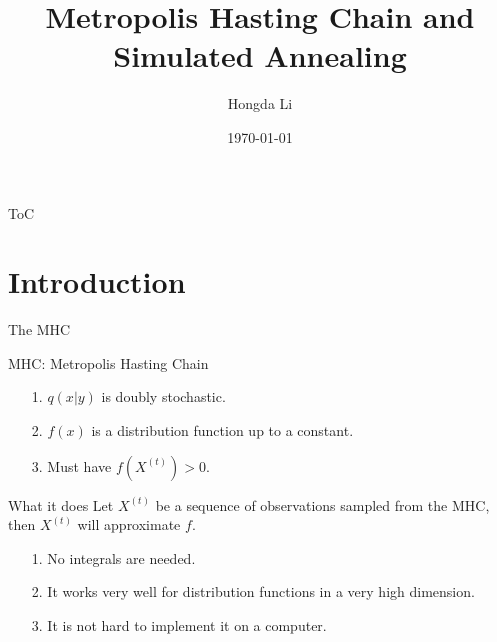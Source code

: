 \documentclass[11pt]{beamer}
\author{Hongda Li}
\title[MHC and SA]{Metropolis Hasting Chain and Simulated Annealing}
\institute[]{UBC Okanagan}
\date{\today}
\begin{document}
\begin{frame}
    \titlepage
\end{frame}

\begin{frame}{ToC}
    \tableofcontents
\end{frame}

\section{Introduction}

    \begin{frame}{The MHC}
        \begin{block}{MHC: Metropolis Hasting Chain}
            \begin{algorithmic}[H]
            \end{algorithmic}
        \end{block}
        \begin{itemize}
            \item [1.] $q(x|y)$ is doubly stochastic. 
            \item [2.] $f(x)$ is a distribution function up to a constant. 
            \item [3.] Must have $f(X^{(t)}) > 0$. 
        \end{itemize}
    \end{frame}
    \begin{frame}{What it does}
        Let $X^{(t)}$ be a sequence of observations sampled from the MHC, then $X^{(t)}$ will approximate $f$. 
        \begin{itemize}
            \item [1.] No integrals are needed. 
            \item [2.] It works very well for distribution functions in a very high dimension. 
            \item [3.] It is not hard to implement it on a computer. 
        \end{itemize}
    \end{frame}
\end{document}
